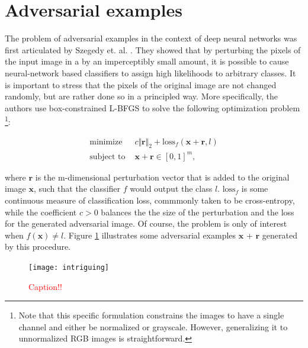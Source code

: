 \documentclass{report}
\newcommand\todo[1]{\textcolor{red}{#1}}
\begin{document}
\section{Adversarial examples}

\noindent The problem of adversarial examples in the context of deep neural networks was first articulated by Szegedy et. al. \cite{intriguing-properties}. They showed that by perturbing the pixels of the input image in a by an imperceptibly small amount, it is possible to cause neural-network based classifiers to assign high likelihoods to arbitrary classes. It is important to stress that the pixels of the original image are not changed randomly, but are rather done so in a principled way. More specifically, the authors use box-constrained L-BFGS \cite{NoceWrig06} to solve the following optimization problem \footnote{Note that this specific formulation constrains the images to have a single channel and either be normalized or grayscale. However, generalizing it to unnormalized RGB images is straightforward.}:

\begin{equation}
\begin{aligned}
\text{minimize } &c \Vert \boldsymbol{r} \Vert_2 + \text{loss}_f(\boldsymbol{x}+\boldsymbol{r}, l) \\
\text{subject to } &\boldsymbol{x} + \boldsymbol{r} \in [0, 1]^m,
\end{aligned}
\label{eq:adv-class-opt}
\end{equation}

\bigskip

\noindent where $\boldsymbol{r}$ is the m-dimensional perturbation vector that is added to the original image $\boldsymbol{x}$, such that the classifier $f$ would output the class $l$. $\text{loss}_f$ is some continuous measure of classification loss, commmonly taken to be cross-entropy, while the coefficient $c > 0$ balances the the size of the perturbation and the loss for the generated adversarial image. Of course, the problem is only of interest when $f(\boldsymbol{x}) \neq l$. Figure \ref{fig:intriguing} illustrates some adversarial examples $\boldsymbol{x}$ + $\boldsymbol{r}$ generated by this procedure.

\begin{figure}
\begin{center}
\texttt{[image: intriguing]}
\caption{\todo{Caption!!}}
\label{fig:intriguing}
\end{center}
\end{figure}
\end{document}
